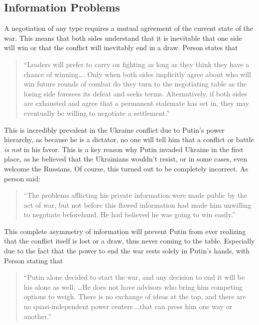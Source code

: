 \documentclass{article}
\begin{document}
    \subsection{Information Problems}
        A negotiation of any type requires a mutual agreement of the current state of the war. This means that both sides understand that it is inevitable that one side will win or that the conflict will inevitably end in a draw. Person states that

        \begin{quote} 
            ``Leaders will prefer to carry on fighting as long as they think they have a chance of winning\ldots. Only when both sides implicitly agree about who will win future rounds of combat do they turn to the negotiating table as the losing side foresees its defeat and seeks terms. Alternatively, if both sides are exhausted and agree that a permanent stalemate has set in, they may eventually be willing to negotiate a settlement.'' \parencite{person_2025}
        \end{quote}

        This is incredibly prevalent in the Ukraine conflict due to Putin's power hierarchy, as because he is a dictator, no one will tell him that a conflict or battle \textit{is not} in his favor. This is a key reason why Putin invaded Ukraine in the first place, as he believed that the Ukrainians wouldn't resist, or in some cases, even welcome the Russians. Of course, this turned out to be completely incorrect. As person said: 
        
        \begin{quote}
            ``The problems afflicting his private information were made public by the act of war, but not before this flawed information had made him unwilling to negotiate beforehand. He had believed he was going to win easily.''\parencite{person_2025}
        \end{quote}
        
        This complete asymmetry of information will prevent Putin from ever realizing that the conflict itself is lost or a draw, thus never coming to the table. Especially due to the fact that the power to end the war rests solely in Putin's hands, with Person stating that 

        \begin{quote}
           ``Putin alone decided to start the war, and any decision to end it will be his alone as well. \ldots He does not have advisors who bring him competing options to weigh. There is no exchange of ideas at the top, and there are no quasi-independent power centers \ldots that can press him one way or another.'' \parencite{person_2025}
        \end{quote}
    
\end{document}
